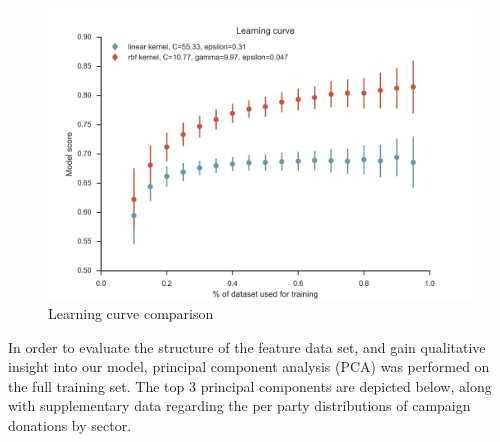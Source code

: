 \documentclass[12]{article}
\begin{document}
\begin{figure}[H]
\begin{center}
\includegraphics[width=0.8\linewidth]{learning_curve.png}
\caption{Learning curve comparison}
\end{center}
\end{figure}

\noindent In order to evaluate the structure of the feature data set, and gain qualitative 
insight into our model, principal component analysis (PCA) was performed on the 
full training set. The top 3 principal components are depicted below, along with 
supplementary data regarding the per party distributions of campaign donations 
by sector.
\end{document}
